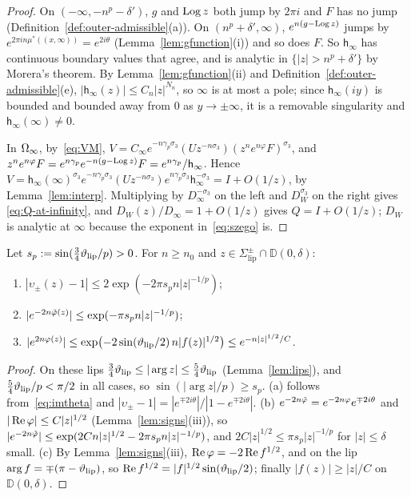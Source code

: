\begin{proof}
On $(-\infty,-n^p-\delta')$, $g$ and $\operatorname{Log} z$ both jump by $2\pi i$ and $F$ has no jump
(Definition~\ref{def:outer-admissible}(a)). On $(n^p+\delta',\infty)$, $e^{n(g-\operatorname{Log} z)}$ jumps by
$e^{2\pi in\mu^*((x,\infty))}=e^{2i\theta}$ (Lemma~\ref{lem:gfunction}(i)) and so does $F$. So $\mathsf h_\infty$ has
continuous boundary values that agree, and is analytic in $\{|z|>n^p+\delta'\}$ by Morera's theorem. By
Lemma~\ref{lem:gfunction}(ii) and Definition~\ref{def:outer-admissible}(e), $|\mathsf h_\infty(z)|\le C_n|z|^{N_n}$, so
$\infty$ is at most a pole; since $\mathsf h_\infty(iy)$ is bounded and bounded away from $0$ as $y\to\pm\infty$, it is
a removable singularity and $\mathsf h_\infty(\infty)\ne0$.

In $\Omega_{\infty}$, by~\eqref{eq:VM}, $V=C_\infty e^{-n\gamma_p\sigma_3}(Uz^{-n\sigma_3})(z^ne^{n\varphi}F)^{\sigma_3}$, and
$z^ne^{n\varphi}F=e^{n\gamma_p}e^{-n(g-\operatorname{Log} z)}F=e^{n\gamma_p}/\mathsf h_\infty$. Hence
$V=\mathsf h_\infty(\infty)^{\sigma_3}e^{-n\gamma_p\sigma_3}(Uz^{-n\sigma_3})e^{n\gamma_p\sigma_3}\mathsf h_\infty^{-\sigma_3}=I+O(1/z)$,
by Lemma~\ref{lem:interp}. Multiplying by $D_\infty^{-\sigma_3}$ on the left and $D_W^{\sigma_3}$ on the right gives
\eqref{eq:Q-at-infinity}, and $D_W(z)/D_\infty=1+O(1/z)$ gives $Q=I+O(1/z)$; $D_W$ is analytic at $\infty$ because the
exponent in~\eqref{eq:szego} is.
\end{proof}

\begin{lemma}\label{lem:supersmall}
Let $s_p:=\sin(\frac34\vartheta_{\mathrm{lip}}/p)>0$. For $n\ge n_0$ and $z\in\Sigma^\pm_{\mathrm{lip}}\cap \mathbb D(0,\delta)$:
\begin{enumerate}
\item[(a)] $|\upsilon_\pm(z)-1|\le2\exp(-2\pi s_pn|z|^{-1/p})$;
\item[(b)] $|e^{-2n\tilde\varphi(z)}|\le\exp(-\pi s_pn|z|^{-1/p})$;
\item[(c)] $|e^{2n\varphi(z)}|\le\exp\bigl(-2\sin(\vartheta_{\mathrm{lip}}/2)\,n|f(z)|^{1/2}\bigr)\le e^{-n|z|^{1/2}/C}$.
\end{enumerate}
\end{lemma}

\begin{proof}
On these lips $\frac34\vartheta_{\mathrm{lip}}\le|\arg z|\le\frac54\vartheta_{\mathrm{lip}}$ (Lemma~\ref{lem:lips}), and $\frac54\vartheta_{\mathrm{lip}}/p<\pi/2$ in all
cases, so $\sin(|\arg z|/p)\ge s_p$. (a) follows from~\eqref{eq:imtheta} and
$|\upsilon_\pm-1|=|e^{\mp2i\theta}|/|1-e^{\mp2i\theta}|$.
(b) $e^{-2n\tilde\varphi}=e^{-2n\varphi}e^{\mp2i\theta}$ and $|\operatorname{Re}\varphi|\le C|z|^{1/2}$ (Lemma~\ref{lem:signs}(iii)), so
$|e^{-2n\tilde\varphi}|\le\exp(2Cn|z|^{1/2}-2\pi s_pn|z|^{-1/p})$, and $2C|z|^{1/2}\le\pi s_p|z|^{-1/p}$ for $|z|\le\delta$
small.
(c) By Lemma~\ref{lem:signs}(iii), $\operatorname{Re}\varphi=-2\operatorname{Re} f^{1/2}$, and on the lip $\arg f=\mp(\pi-\vartheta_{\mathrm{lip}})$, so
$\operatorname{Re} f^{1/2}=|f|^{1/2}\sin(\vartheta_{\mathrm{lip}}/2)$; finally $|f(z)|\ge|z|/C$ on $\mathbb D(0,\delta)$.
\end{proof}

